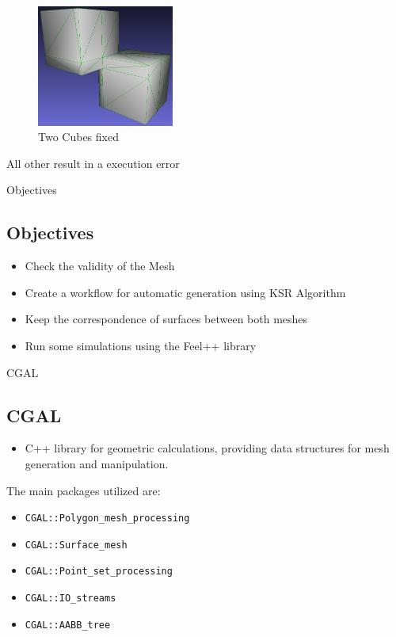 \documentclass[10pt]{beamer}
\begin{document}
\begin{frame}
\begin{figure}
    \centering
    \includegraphics[width=0.4\textwidth]{../image/2_cubes_fixed.png}
    \caption{Two Cubes fixed}
  \end{figure}
All other result in a execution error
\end{frame}

\begin{frame}{Objectives}
    \subsection{Objectives}
    \begin{itemize}
        \item Check the validity of the Mesh
        \item Create a workflow for automatic generation using KSR Algorithm
        \item Keep the correspondence of surfaces between both meshes
        \item Run some simulations using the Feel++ library
    \end{itemize}
\end{frame}


\begin{frame}{CGAL}
    \subsection{CGAL}
    \begin{itemize}
        \item C++ library for geometric calculations, providing data structures for mesh generation and manipulation.
    \end{itemize}
    \vspace{0.5cm}
    The main packages utilized are:
    \begin{itemize}
        \item \texttt{CGAL::Polygon\_mesh\_processing}
        \item \texttt{CGAL::Surface\_mesh}
        \item \texttt{CGAL::Point\_set\_processing}
        \item \texttt{CGAL::IO\_streams}
        \item \texttt{CGAL::AABB\_tree}
    \end{itemize}
    
\end{frame}
\end{document}
